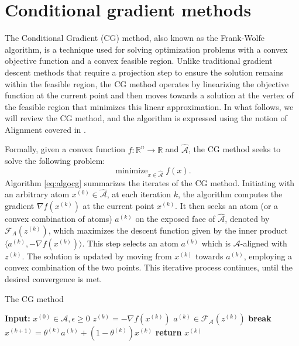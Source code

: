 \documentclass[10pt, twocolumn, reqno, a4paper,oneside]{amsart}
\numberwithin{equation}{section}
\numberwithin{theorem}{section}
\numberwithin{figure}{section}
\numberwithin{table}{section}
\numberwithin{theorem}{section}
\numberwithin{equation}{section}
\DeclareMathOperator*{\minimize}{minimize}
\begin{document}
\section{Conditional gradient methods} \label{ sec:cg }

The Conditional Gradient (CG) method, also known as the Frank-Wolfe algorithm, is a technique used for solving optimization problems with a convex objective function and a convex feasible region. Unlike traditional gradient descent methods that require a projection step to ensure the solution remains within the feasible region, the CG method operates by linearizing the objective function at the current point and then moves towards a solution at the vertex of the feasible region that minimizes this linear approximation. In what follows, we will review the CG method, and the algorithm is expressed using the notion of Alignment covered in \cite{2019PolarAlignment}.

Formally, given a convex function $f: \mathbb{R}^n \rightarrow \mathbb{R}$ and $\hat{\mathcal{A}}$, the CG method seeks to solve the following problem:
\begin{equation} \label{eq:cg}
	\minimize_{x \in \hat{\mathcal{A}}} f(x).
\end{equation}
Algorithm \ref{eq:algocg} summarizes the iterates of the CG method. Initiating with an arbitrary atom $x^{(0)} \in \hat{\mathcal{A}}$, at each iteration $k$, the algorithm computes the gradient $\nabla f(x^{(k)})$ at the current point $x^{(k)}$. It then seeks an atom (or a convex combination of atoms) $a^{(k)}$ on the exposed face of $\hat{\mathcal{A}}$, denoted by $\mathcal{F}_A(z^{(k)})$, which maximizes the descent function given by the inner product $\langle a^{(k)}, -\nabla f(x^{(k)}) \rangle$. This step selects an atom $a^{(k)}$ which is $\mathcal{A}$-aligned with $z^{(k)}$. The solution is updated by moving from $x^{(k)}$ towards $a^{(k)}$, employing a convex combination of the two points. This iterative process continues, until the desired convergence is met.


\begin{algorithm}
	\caption{The CG method}
	\begin{algorithmic}[1]
		\State \textbf{Input:} $x^{(0)} \in \mathcal{A}, \epsilon \geq 0$
		\State $z^{(k)} = -\nabla f(x^{(k)})$
		\State $a^{(k)} \in \mathcal{F}_\mathcal{A}(z^{(k)})$
		\State \textbf{break} 
		\EndIf
		\State $x^{(k+1)} = \theta^{(k)} a^{(k)} + (1 - \theta^{(k)}) x^{(k)}$ 
		\EndFor
		\State \textbf{return} $x^{(k)}$
	\end{algorithmic}\label{eq:algocg}
\end{algorithm}
\end{document}
